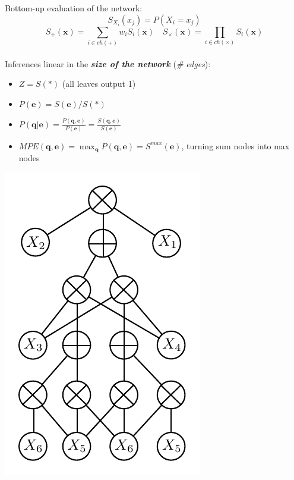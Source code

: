 \documentclass[final]{beamer}
\begin{document}
\begin{frame}{}
\begin{textblock}{25.2}
\begin{minipage}{0.7\linewidth}
    Bottom-up evaluation of the network:
    $$S_{X_i}(x_j)=P(X_i=x_j)$$    
    $$S_{+}(\mathbf{x})=\sum\limits_{i\in
      ch(+)}w_{i}S_{i}(\mathbf{x})\quad S_{\times}(\mathbf{x})=\prod\limits_{i\in
      ch(\times)}S_{i}(\mathbf{x})$$\\[10pt]
    \setlength{\leftmargini}{30pt}
    Inferences linear in the \emph{\textbf{size of the network}} (\emph{\# edges}):
    \begin{itemize}
    \item $Z = S(*)$ (all leaves output 1)
    \item $P(\mathbf{e}) = S(\mathbf{e})/S(*)$
    \item $P(\mathbf{q}| \mathbf{e}) = \frac{P(\mathbf{q},
        \mathbf{e})}{P(\mathbf{e})} = \frac{S(\mathbf{q},
        \mathbf{e})}{S(\mathbf{e})}$
    \item $MPE(\mathbf{q},\mathbf{e}) = \max_{\mathbf{q}}P(\mathbf{q},
      \mathbf{e}) = S^{max}(\mathbf{e})$, turning sum nodes into max nodes
    \end{itemize}
  \end{minipage}\begin{minipage}{0.28\linewidth}
    \includegraphics[width=0.8\linewidth]{figures/spn-long}
  \end{minipage}\\[20pt]


\end{textblock}
\end{frame}
\end{document}
